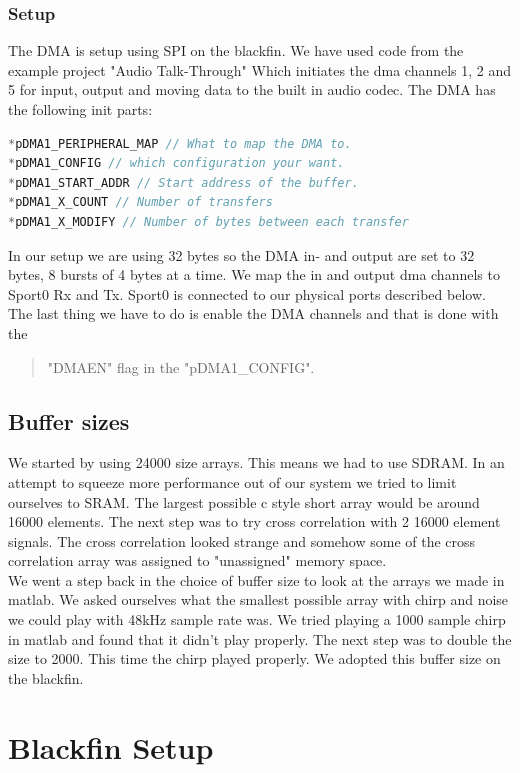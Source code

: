 \subsubsection{Setup}
The DMA is setup using SPI on the blackfin. We have used code from the example project "Audio Talk-Through" Which initiates the dma channels 1, 2 and 5 for input, output and moving data to the built in audio codec. The DMA has the following init parts:
\begin{lstlisting}[language=C]
*pDMA1_PERIPHERAL_MAP // What to map the DMA to.
*pDMA1_CONFIG // which configuration your want.
*pDMA1_START_ADDR // Start address of the buffer.
*pDMA1_X_COUNT // Number of transfers
*pDMA1_X_MODIFY // Number of bytes between each transfer
\end{lstlisting}
In our setup we are using 32 bytes so the DMA in- and output are set to 32 bytes, 8 bursts of 4 bytes at a time. We map the in and output dma channels to Sport0 Rx and Tx. Sport0 is connected to our physical ports described below. The last thing we have to do is enable the DMA channels and that is done with the \begin{quote}
"DMAEN" flag in the "pDMA1\_CONFIG".
\end{quote}

\subsection{Buffer sizes}
We started by using 24000 size arrays. This means we had to use SDRAM. In an attempt to squeeze more performance out of our system we tried to limit ourselves to SRAM. The largest possible c style short array would be around 16000 elements. The next step was to try cross correlation with 2 16000 element signals. The cross correlation looked strange and somehow some of the cross correlation array was assigned to "unassigned" memory space.\\
We went a step back in the choice of buffer size to look at the arrays we made in matlab. We asked ourselves what the smallest possible array with chirp and noise we could play with 48kHz sample rate was. We tried playing a 1000 sample chirp in matlab and found that it didn't play properly. The next step was to double the size to 2000. This time the chirp played properly. We adopted this buffer size on the blackfin.\\


\section{Blackfin Setup}
